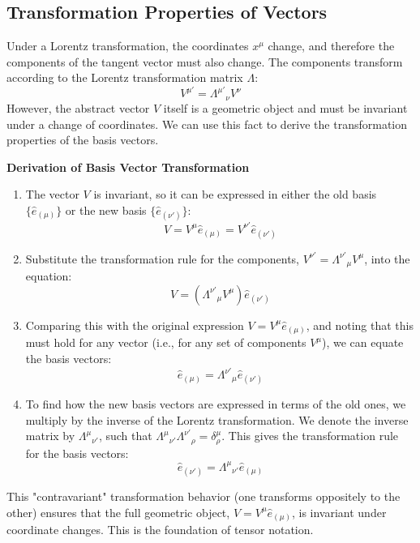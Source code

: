 \documentclass[11pt, a4paper]{report}
\begin{document}
\subsection*{Transformation Properties of Vectors}

Under a Lorentz transformation, the coordinates $x^\mu$ change, and therefore the components of the tangent vector must also change. The components transform according to the Lorentz transformation matrix $\Lambda$:
\begin{equation}
    V^{\mu'} = {\Lambda^{\mu'}}_\nu V^\nu
\end{equation}
However, the abstract vector $V$ itself is a geometric object and must be invariant under a change of coordinates. We can use this fact to derive the transformation properties of the basis vectors.

\textbf{Derivation of Basis Vector Transformation}
\begin{enumerate}
    \item The vector $V$ is invariant, so it can be expressed in either the old basis $\{\hat{e}_{(\mu)}\}$ or the new basis $\{\hat{e}_{(\nu')}\}$:
    \[
        V = V^\mu \hat{e}_{(\mu)} = V^{\nu'} \hat{e}_{(\nu')}
    \]
    \item Substitute the transformation rule for the components, $V^{\nu'} = {\Lambda^{\nu'}}_\mu V^\mu$, into the equation:
    \[
        V = ({\Lambda^{\nu'}}_\mu V^\mu) \hat{e}_{(\nu')}
    \]
    \item Comparing this with the original expression $V = V^\mu \hat{e}_{(\mu)}$, and noting that this must hold for any vector (i.e., for any set of components $V^\mu$), we can equate the basis vectors:
    \[
        \hat{e}_{(\mu)} = {\Lambda^{\nu'}}_\mu \hat{e}_{(\nu')}
    \]
    \item To find how the new basis vectors are expressed in terms of the old ones, we multiply by the inverse of the Lorentz transformation. We denote the inverse matrix by ${\Lambda^\mu}_{\nu'}$, such that ${\Lambda^\mu}_{\nu'} {\Lambda^{\nu'}}_\rho = \delta^\mu_\rho$. This gives the transformation rule for the basis vectors:
    \begin{equation}
        \hat{e}_{(\nu')} = {\Lambda^\mu}_{\nu'} \hat{e}_{(\mu)}
    \end{equation}
\end{enumerate}


This "contravariant" transformation behavior (one transforms oppositely to the other) ensures that the full geometric object, $V = V^\mu \hat{e}_{(\mu)}$, is invariant under coordinate changes. This is the foundation of tensor notation.
\end{document}
